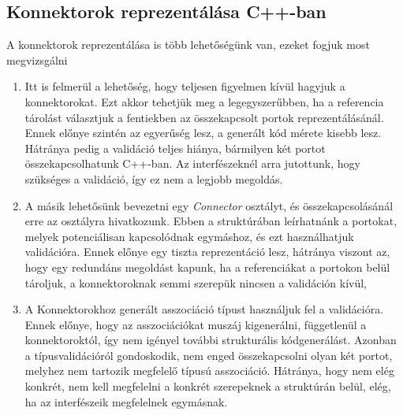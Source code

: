 \documentclass[a4paper,12pt]{report}
\begin{document}
\subsection{Konnektorok reprezentálása C++-ban}
A konnektorok reprezentálása is több lehetőségünk van, ezeket fogjuk most megvizsgálni
\begin{enumerate}
\item Itt is felmerül a lehetőség, hogy teljesen figyelmen kívül hagyjuk a konnektorokat. Ezt akkor tehetjük meg a legegyszerűbben, ha a referencia tárolást választjuk a fentiekben az összekapcsolt portok reprezentálásánál. Ennek előnye szintén az egyerűség lesz, a generált kód mérete kisebb lesz. Hátránya pedig a validáció teljes hiánya, bármilyen két portot összekapcsolhatunk C++-ban. Az interfészeknél arra jutottunk, hogy szükséges a validáció, így ez nem a legjobb megoldás.
\item A másik lehetősünk bevezetni egy \textit{Connector} osztályt, és összekapcsolásánál erre az osztályra hivatkozunk. Ebben a struktúrában leírhatnánk a portokat, melyek potenciálisan kapcsolódnak egymáshoz, és ezt használhatjuk validációra. Ennek előnye egy tiszta reprezentáció lesz, hátránya viszont az, hogy egy redundáns megoldást kapunk, ha a referenciákat a portokon belül tároljuk, a konnektoroknak semmi szerepük nincsen a validáción kívül,
\item A Konnektorokhoz generált asszociáció típust használjuk fel a validációra. Ennek előnye, hogy az asszociációkat muszáj kigenerálni, függetlenül a konnektoroktól, így nem igényel további strukturális kódgenerálást. Azonban a típusvalidációról gondoskodik, nem enged összekapcsolni olyan két portot, melyhez nem tartozik megfelelő típusú asszociáció. Hátránya, hogy nem elég konkrét, nem kell megfelelni a konkrét szerepeknek a struktúrán belül, elég, ha az interfészeik megfelelnek egymásnak.

\end{enumerate}
\end{document}
